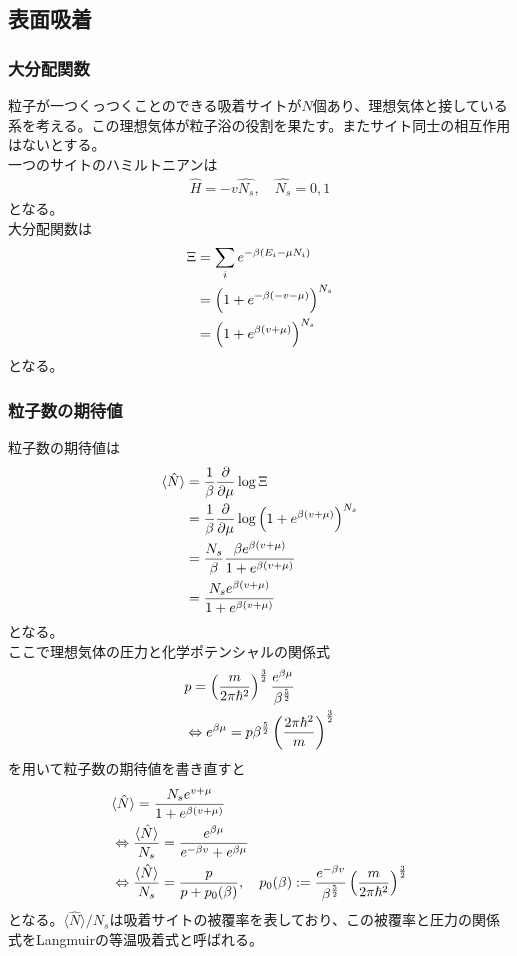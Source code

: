 \documentclass{jsarticle}  %
\numberwithin{equation}{section} %
\numberwithin{figure}{section}
\begin{document}
\subsection{表面吸着}
\subsubsection{大分配関数}
    粒子が一つくっつくことのできる吸着サイトが$N$個あり、理想気体と接している系を考える。この理想気体が粒子浴の役割を果たす。またサイト同士の相互作用はないとする。\\
    一つのサイトのハミルトニアンは
    \begin{align}
        \hat{H} = -v \hat{N_s},\quad \hat{N_s} = 0,1
    \end{align}
    となる。\\
    大分配関数は
    \begin{align}
        \Xi &= \sum_i e^{-\beta (E_i - \mu N_i) } \notag \\
        &= \left( 1 + e^{-\beta (-v - \mu)} \right)^{N_s} \notag \\
        &= \left( 1 + e^{\beta (v + \mu)} \right)^{N_s}
    \end{align}
    となる。
\subsubsection{粒子数の期待値}
    粒子数の期待値は
    \begin{align}
        \langle \hat{N} \rangle &= \frac{1}{\beta} \frac{\partial}{\partial \mu} \log \Xi \notag \\ 
        &= \frac{1}{\beta} \frac{\partial}{\partial \mu} \log \left( 1 + e^{\beta (v + \mu)} \right)^{N_s} \notag \\
        &= \frac{N_s}{\beta} \frac{\beta e^{\beta(v + \mu)}}{ 1 + e^{\beta (v + \mu)}} \notag \\
        &= \frac{N_s e^{\beta(v + \mu)}}{ 1 + e^{\beta (v + \mu)}}
    \end{align}
    となる。\\
    ここで理想気体の圧力と化学ポテンシャルの関係式
    \begin{align}
        &p = \left( \frac{m}{2\pi \hbar^2 } \right)^{\frac{3}{2}} \frac{e^{\beta \mu}}{\beta^{\frac{5}{2}}} \notag \\
        &\Leftrightarrow e^{\beta \mu} = p \beta^{\frac{5}{2}} \left( \frac{2\pi \hbar^2}{m} \right)^{\frac{3}{2}}
    \end{align}
    を用いて粒子数の期待値を書き直すと
    \begin{align}
        &\langle \hat{N} \rangle = \frac{N_s e^{v + \mu}}{ 1 + e^{\beta (v + \mu)}} \notag \\
        &\Leftrightarrow \frac{\langle \hat{N} \rangle}{N_s} = \frac{ e^{\beta \mu}}{ e^{-\beta v} + e^{\beta \mu}} \notag \\
        &\Leftrightarrow \frac{\langle \hat{N} \rangle}{N_s} = \frac{p}{p + p_0(\beta)} ,\quad p_0(\beta) := \frac{e^{-\beta v}}{\beta^{\frac{5}{2}}}  \left( \frac{m}{2\pi \hbar^2 } \right)^{\frac{3}{2}}
    \end{align}
    となる。$\langle \hat{N} \rangle / N_s$は吸着サイトの被覆率を表しており、この被覆率と圧力の関係式をLangmuirの等温吸着式と呼ばれる。 
\end{document}
